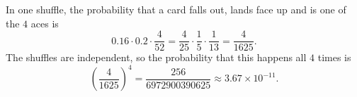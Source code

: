 In one shuffle, the probability that a card falls out, lands face up and is one of the $4$ aces is
\[0.16\cdot0.2\cdot\dfrac{4}{52}=\dfrac{4}{25}\cdot\dfrac15\cdot\dfrac1{13}=\dfrac{4}{1625}.\]
The shuffles are independent, so the probability that this happens all $4$ times is
\[\left(\dfrac{4}{1625}\right)^4=\boxed{\dfrac{256}{6972900390625}}\approx3.67\times10^{-11}.\]
